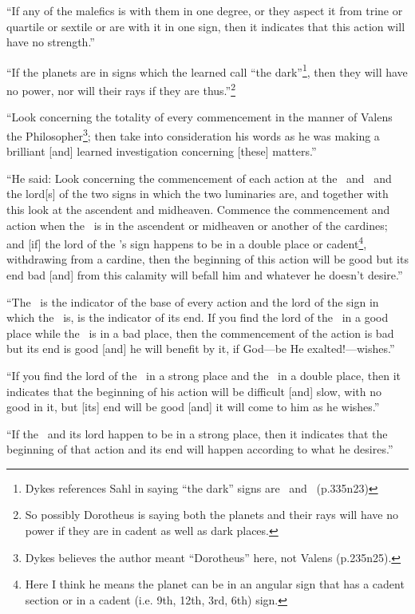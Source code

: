 ``If  any of the malefics is with them in one degree, or they aspect it from trine or quartile or sextile or are with it in one sign, then it indicates that this action will have no strength.''

``If  the planets are in signs which the learned call ``the dark''\footnote{Dykes references Sahl in saying ``the dark'' signs are \Libra\, and \Capricorn\, (p.335n23)}, then they will have no power, nor will their rays if they are thus.''\footnote{So possibly Dorotheus is saying both the planets and their rays will have no power if they are in cadent as well as dark places.} 

``Look  concerning the totality of every commencement in the manner of Valens the Philosopher\footnote{Dykes believes the author meant ``Dorotheus'' here, not Valens (p.235n25).}; then take into consideration his words as he was making a brilliant [and] learned investigation concerning [these] matters.''

``He  said: Look concerning the commencement of each action at the \Sun\, and \Moon\, and the lord[s] of the two signs in which the two luminaries are, and together with this look at the ascendent and midheaven. Commence the commencement and action when the \Moon\, is in the ascendent or midheaven or another of the cardines; and [if] the lord of the \Moon's sign happens to be in a double place or cadent\footnote{Here I think he means the planet can be in an angular sign that has a cadent section or in a cadent (i.e. 9th, 12th, 3rd, 6th) sign.}, withdrawing from a cardine, then the beginning of this action will be good but its end bad [and] from this calamity will befall him and whatever he doesn't desire.''

``The \Moon\, is the indicator of the base of every action and the lord of the sign in which the \Moon\, is, is the indicator of its end. If you find the lord of the \Moon\, in a good place while the \Moon\, is in a bad place, then the commencement of the action is bad but its end is good [and] he will benefit by it, if God---be He exalted!---wishes.''

``If  you find the lord of the \Moon\, in a strong place and the \Moon\, in a double place, then it indicates that the beginning of his action will be difficult [and] slow, with no good in it, but [its] end will be good [and] it will come to him as he wishes.''

``If  the \Moon\, and its lord happen to be in a strong place, then it indicates that the beginning of that action and its end will happen according to what he desires.''

